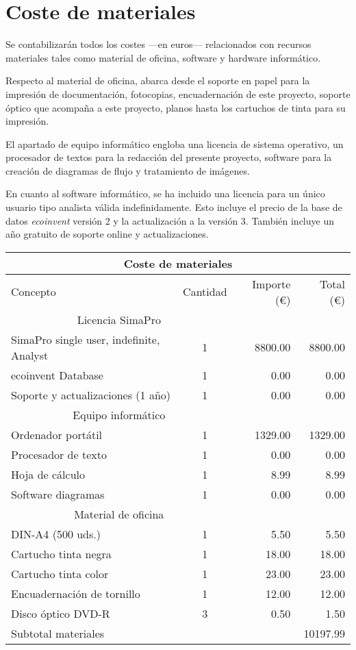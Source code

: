 \chapter*{Coste de materiales}
Se contabilizarán todos los costes —en euros— relacionados con recursos materiales tales como material de oficina, software y hardware informático.

Respecto al material de oficina, abarca desde el soporte en papel para la impresión de documentación, fotocopias, encuadernación de este proyecto, soporte óptico que acompaña a este proyecto, planos hasta los cartuchos de tinta para su impresión.

El apartado de equipo informático engloba una licencia de sistema operativo, un procesador de textos para la redacción del presente proyecto, software para la creación de diagramas de flujo y tratamiento de imágenes.

En cuanto al software informático, se ha incluido una licencia para un único usuario tipo analista válida indefinidamente. Esto incluye el precio de la base de datos \textit{ecoinvent} versión 2 y la actualización a la versión 3. También incluye un año gratuito de soporte online y actualizaciones.

\begin{table}[!htb]
\centering
\begin{tabular}{lcrr}
\toprule
\multicolumn{4}{c}{Coste de materiales}\\
\midrule
Concepto & Cantidad & Importe (\euro) & Total (\euro)\\
\midrule
\multicolumn{2}{c}{Licencia SimaPro}\\
\cmidrule(r){1-2}
SimaPro single user, indefinite, Analyst & 1 & 8800.00 & 8800.00\\
ecoinvent Database & 1 & 0.00 & 0.00\\
Soporte y actualizaciones (1 año) & 1 & 0.00 & 0.00\\
\multicolumn{2}{c}{Equipo informático}\\
\cmidrule(r){1-2}
Ordenador portátil & 1 & 1329.00 & 1329.00\\
Procesador de texto & 1 & 0.00 & 0.00\\
Hoja de cálculo & 1 & 8.99 & 8.99\\
Software diagramas & 1 & 0.00 & 0.00\\
\multicolumn{2}{c}{Material de oficina}\\
\cmidrule(r){1-2}
DIN-A4 (500 uds.) & 1 & 5.50 & 5.50\\
Cartucho tinta negra & 1 & 18.00 & 18.00\\
Cartucho tinta color & 1 & 23.00 & 23.00\\
Encuadernación de tornillo & 1 & 12.00 & 12.00\\
Disco óptico DVD-R & 3 & 0.50 & 1.50\\
\bottomrule
Subtotal materiales & & & 10197.99\\
\bottomrule
\end{tabular}
\label{presupuestomateriales}
\end{table}

